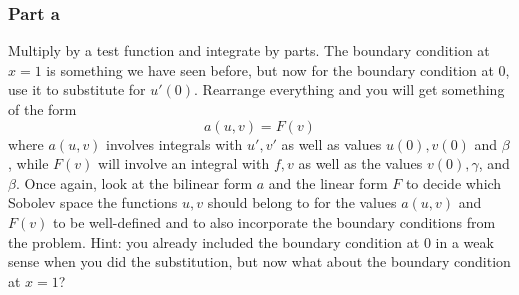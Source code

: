 \documentclass{article}
\theoremstyle{definition}
\theoremstyle{plain}
\begin{document}
\subsubsection{Part a}
Multiply by a test function and integrate by parts.
The boundary condition at $x=1$ is something we have seen before, but now for the boundary condition at $0$, use it to substitute for $u'(0)$.
Rearrange everything and you will get something of the form
\begin{equation}
    a(u,v) = F(v)
\end{equation}
where $a(u,v)$ involves integrals with $u',v'$ as well as values $u(0),v(0)$ and $\beta$, while $F(v)$ will involve an integral with $f,v$ as well as the values $v(0),\gamma$, and $\beta$.
Once again, look at the bilinear form $a$ and the linear form $F$ to decide which Sobolev space the functions $u,v$ should belong to for the values $a(u,v)$ and $F(v)$ to be well-defined and to also incorporate the boundary conditions from the problem.
Hint: you already included the boundary condition at $0$ in a weak sense when you did the substitution, but now what about the boundary condition at $x = 1$?
\end{document}

